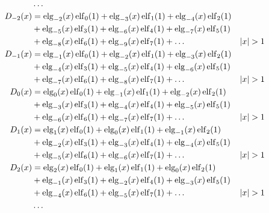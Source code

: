 \begin{equation*} \begin{aligned}
&\ldots \\
%
D_{-2}(x) &=   
  \elg_{-2}(x) \elf_0(1)
+ \elg_{-3}(x) \elf_1(1)  
+ \elg_{-4}(x) \elf_2(1) \\ &
+ \elg_{-5}(x) \elf_3(1)
+ \elg_{-6}(x) \elf_4(1)
+ \elg_{-7}(x) \elf_5(1) \\ &
+ \elg_{-8}(x) \elf_6(1)
+ \elg_{-9}(x) \elf_7(1)
+ \ldots & 
&|x| > 1 \\
%
D_{-1}(x) &=
  \elg_{-1}(x) \elf_0(1)
+ \elg_{-2}(x) \elf_1(1)  
+ \elg_{-3}(x) \elf_2(1) \\ &
+ \elg_{-4}(x) \elf_3(1)
+ \elg_{-5}(x) \elf_4(1)
+ \elg_{-6}(x) \elf_5(1) \\ &
+ \elg_{-7}(x) \elf_6(1)
+ \elg_{-8}(x) \elf_7(1)
+ \ldots & 
&|x| > 1 \\
%
D_0(x) &=
  \elg_0(x) \elf_0(1)
+ \elg_{-1}(x) \elf_1(1)  
+ \elg_{-2}(x) \elf_2(1) \\ &
+ \elg_{-3}(x) \elf_3(1)
+ \elg_{-4}(x) \elf_4(1)
+ \elg_{-5}(x) \elf_5(1) \\ &
+ \elg_{-6}(x) \elf_6(1)
+ \elg_{-7}(x) \elf_7(1)
+ \ldots & 
&|x| > 1 \\
%
D_1(x) &=
  \elg_1(x) \elf_0(1)
+ \elg_0(x) \elf_1(1)
+ \elg_{-1}(x) \elf_2(1) \\ &
+ \elg_{-2}(x) \elf_3(1)
+ \elg_{-3}(x) \elf_4(1)
+ \elg_{-4}(x) \elf_5(1) \\ &
+ \elg_{-5}(x) \elf_6(1)
+ \elg_{-6}(x) \elf_7(1)
+ \ldots & 
&|x| > 1 \\
%
D_2(x) &=
  \elg_2(x) \elf_0(1)
+ \elg_1(x) \elf_1(1)
+ \elg_0(x) \elf_2(1) \\ &
+ \elg_{-1}(x) \elf_3(1)
+ \elg_{-2}(x) \elf_4(1)
+ \elg_{-3}(x) \elf_5(1) \\ &
+ \elg_{-4}(x) \elf_6(1)
+ \elg_{-5}(x) \elf_7(1)
+ \ldots & 
&|x| > 1 \\
%
&\ldots \\
\end{aligned} \end{equation*}

